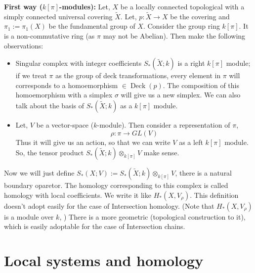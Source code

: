 \documentclass[11pt]{article}
\begin{document}
\noindent \textbf{First way ($k[\pi]$-modules):} Let, $X$ be a locally connected topological with a simply connected universal covering $\tilde{X}$. Let, $p: \tilde{X}\to X$ be the covering and $\pi_1 := \pi_1(X)$ be the fundamental group of $X$. Consider the group ring $k[\pi]$. It is a non-commutative ring (as $\pi$ may not be Abelian). Then make the following observations:
\begin{itemize}
    \item Singular complex with integer coefficients $S_{\ast}(\tilde{X};k)$ is a right $k[\pi]$ module; if we treat $\pi$ as the group of deck transformations, every element in $\pi$ will corresponds to a homoemorphism $\in \operatorname{Deck}(p)$. The composition of this homoemorphism with a simplex $\sigma$ will give us a new simplex. We can also talk about the basis of $S_{\ast}(\tilde{X};k)$ as a $k [\pi]$ module.
    \item Let, $V$ be a vector-space ($k$-module). Then consider a representation of $\pi$, $$\rho : \pi \to GL(V)$$ Thus it will give us an action, so that we can write $V$ as a left $k[\pi]$ module. So, the tensor product $S_{\ast}(\tilde{X};k)\otimes_{k[\pi]}V$ make sense.
\end{itemize}
Now we will just define $S_{\ast}(X;V):= S_{\ast}(\tilde{X};k)\otimes_{k[\pi]}V$, there is a natural boundary oparetor. The homology corresponding to this complex is called homology with local coefficients. We write it like $H_{\ast}(X,V_{\rho})$. This definition doesn't adopt easily for the case of Intersection homology. (Note that $H_{\ast}(X,V_{\rho})$ is a module over $k$, ) There is a more geometric (topological construction to it), which is easily adoptable for the case of Intersection chains.

\section{Local systems and homology} 
\newcommand{\el}{\mathcal{L}}
\end{document}
